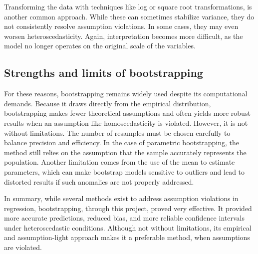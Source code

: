 \noindent Transforming the data with techniques like log or square root transformations, is another common approach. While these can sometimes stabilize variance, they do not consistently resolve assumption violations. In some cases, they may even worsen heteroscedasticity. Again, interpretation becomes more difficult, as the model no longer operates on the original scale of the variables.


\subsection{Strengths and limits of bootstrapping}
For these reasons, bootstrapping remains widely used despite its computational demands. Because it draws directly from the empirical distribution, bootstrapping makes fewer theoretical assumptions and often yields more robust results when an assumption like homoscedasticity is violated. However, it is not without limitations. The number of resamples must be chosen carefully to balance precision and efficiency. In the case of parametric bootstrapping, the method still relies on the assumption that the sample accurately represents the population. Another limitation comes from the use of the mean to estimate parameters, which can make bootstrap models sensitive to outliers and lead to distorted results if such anomalies are not properly addressed.

\noindent In summary, while several methods exist to address assumption violations in regression, bootstrapping, through this project, proved very effective. It provided more accurate predictions, reduced bias, and more reliable confidence intervals under heteroscedastic conditions. Although not without limitations, its empirical and assumption-light approach makes it a preferable method, when assumptions are violated.